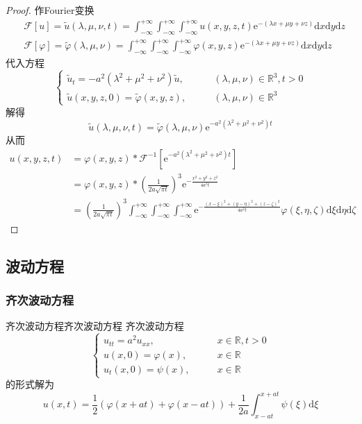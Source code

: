 \documentclass[lang = cn, scheme = chinese, thmcnt = section]{elegantbook}
\newcommand{\R}{\mathbb{R}}            %
\newcommand{\dd}{\mathrm{d}}           %
\newcommand{\ee}[1]{\mathrm{e}^{#1}}   %
\begin{document}
\begin{proof}
	作Fourier变换%
	\begin{align*}
		& \mathscr{F}[u]=\tilde{u}(\lambda,\mu,\nu,t)=\int_{-\infty}^{+\infty}\int_{-\infty}^{+\infty}\int_{-\infty}^{+\infty}u(x,y,z,t)\ee{-(\lambda x+\mu y+\nu z)}\dd x\dd y\dd z\\
		& \mathscr{F}[\varphi]=\tilde{\varphi}(\lambda,\mu,\nu)=\int_{-\infty}^{+\infty}\int_{-\infty}^{+\infty}\int_{-\infty}^{+\infty}\varphi(x,y,z)\ee{-(\lambda x+\mu y+\nu z)}\dd x\dd y\dd z
	\end{align*}
	代入方程
	$$
	\begin{cases}
		\tilde{u}_t=-a^2(\lambda^2+\mu^2+\nu^2)\tilde{u},\qquad & (\lambda,\mu,\nu)\in\R^3,t>0\\
		\tilde{u}(x,y,z,0)=\tilde{\varphi}(x,y,z),\qquad & (\lambda,\mu,\nu)\in\R^3
	\end{cases}
	$$
	解得%
	$$
	\tilde{u}(\lambda,\mu,\nu,t)=
	\tilde{\varphi}(\lambda,\mu,\nu)\ee{-a^2(\lambda^2+\mu^2+\nu^2)t}
	$$
	从而%
	\begin{align*}
		u(x,y,z,t)
		& = \varphi(x,y,z)*\mathscr{F}^{-1}\left[\ee{-a^2(\lambda^2+\mu^2+\nu^2)t}\right]\\
		& =\varphi(x,y,z)*\left(\frac{1}{2a\sqrt{\pi t}}\right)^3\ee{-\frac{x^2+y^2+z^2}{4a^2t}}\\
		& =\left(\frac{1}{2a\sqrt{\pi t}}\right)^3
		\int_{-\infty}^{+\infty}\int_{-\infty}^{+\infty}\int_{-\infty}^{+\infty}
		\ee{-\frac{(x-\xi)^2+(y-\eta)^2+(z-\zeta)^2}{4a^2t}}\varphi(\xi,\eta,\zeta)\dd\xi\dd\eta\dd\zeta
	\end{align*}
\end{proof}

\subsection{波动方程}

\subsubsection{齐次波动方程}

\begin{theorem}{齐次波动方程}{齐次波动方程}
	齐次波动方程
	$$
	\begin{cases}
		u_{tt}=a^2u_{xx},\qquad & x\in\R,t>0\\
		u(x,0)=\varphi(x),\qquad & x\in\R\\
		u_t(x,0)=\psi(x),\qquad & x\in\R
	\end{cases}
	$$
	的形式解为
	$$
	u(x,t)
	= \frac{1}{2}(\varphi(x+at)+\varphi(x-at))+\frac{1}{2a}\int_{x-at}^{x+at}\psi(\xi)\dd\xi
	$$
\end{theorem}
\end{document}
